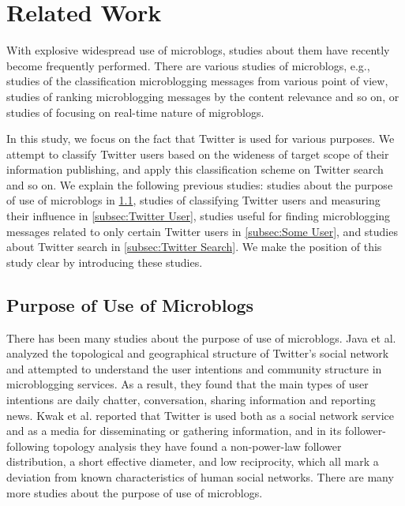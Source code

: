\section{Related Work}
\label{sec:Related Work}

With explosive widespread use of microblogs, studies about
them have recently become frequently performed.  There are various
studies of microblogs, e.g., studies of the
classification microblogging messages from various point of
view\cite{irani2010study}, studies of ranking microblogging messages by
the content relevance and so on\cite{duan2010empirical}, or studies of focusing on
real-time nature of migroblogs\cite{takemura2012tweet,mathioudakis2010twittermonitor}.

In this study, we focus on the fact that Twitter is used for various
purposes. We attempt to classify Twitter users based on the
wideness of target scope of their information publishing, and apply this
classification scheme on Twitter search and so on.  We explain the
following previous studies: studies about the purpose of use of
microblogs in \ref{subsec:Purpose of Use}, studies of
classifying Twitter users and measuring their influence in
\ref{subsec:Twitter User}, studies useful for finding microblogging
messages related to only certain Twitter users in \ref{subsec:Some
User}, and studies about Twitter search in \ref{subsec:Twitter Search}.
We make the position of this study clear by introducing these studies.

\subsection{Purpose of Use of Microblogs}
\label{subsec:Purpose of Use}

There has been many studies about the purpose of use of microblogs. Java
et al.\cite{java2007we} analyzed the topological and
geographical structure of Twitter's social network and attempted to
understand the user intentions and community structure in microblogging
services.  As a result, they found that the main types of user
intentions are daily chatter, conversation, sharing information and
reporting news.  Kwak et al.\cite{kwak2010twitter} reported that Twitter
is used both as a social network service and as a media for
disseminating or gathering information, and in its follower-following
topology analysis they have found a non-power-law follower distribution,
a short effective diameter, and low reciprocity, which all mark a
deviation from known characteristics of human social networks.  There
are many more studies about the purpose of use of microblogs\cite{wu2011says,zhao2009and}.

